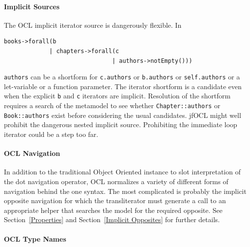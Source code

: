 \documentclass[sigconf]{acmart}
\begin{document}
\paragraph{Implicit Sources}
The OCL implicit iterator source is dangerously flexible. In

\begin{verbatim}
books->forall(b
             | chapters->forall(c
                               | authors->notEmpty()))
\end{verbatim}

\verb|authors| can be a shortform for \verb|c.authors| or \verb|b.authors| or \verb|self.authors| or a let-variable or a function parameter. The iterator shortform is a candidate even when the explicit \verb|b| and \verb|c| iterators are implicit. Resolution of the shortform requires a search of the metamodel to see whether \verb|Chapter::authors| or \verb|Book::authors| exist before considering the usual candidates. jfOCL might well prohibit the dangerous nested implicit source. Prohibiting the immediate loop iterator could be a step too far.  

\paragraph{OCL Navigation}


In addition to the traditional Object Oriented instance to slot interpretation of the dot navigation operator, OCL normalizes a variety of different forms of navigation behind the one syntax. The most complicated is probably the implicit opposite navigation for which the transliterator must generate a call to an appropriate helper that searches the model for the required opposite. See Section~\ref{Properties}  and Section~\ref{Implicit Opposites} for further details.

\paragraph{OCL Type Names}
\end{document}
